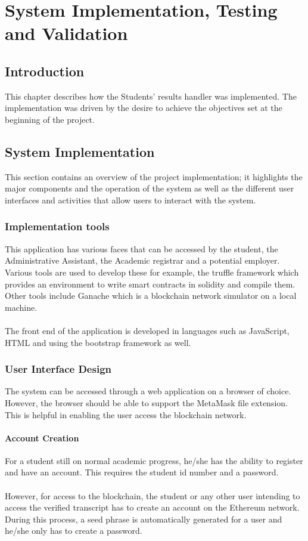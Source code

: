 \chapter{System Implementation, Testing and Validation}
\section{Introduction}
This chapter describes how the Students’ results handler was implemented. The implementation was driven by the desire to achieve the objectives set at the beginning of the project.

\section{System Implementation}
This section contains an overview of the project implementation; it highlights the major components and the operation of the system as well as the different user interfaces and activities that allow users to interact with the system.

\subsection{Implementation tools}
This application has various faces that can be accessed by the student, the Administrative Assistant, the Academic registrar and a potential employer. Various tools are used to develop these for example, the truffle framework which provides an environment to write smart contracts in solidity and compile them. Other tools include Ganache\cite{art14} which is a blockchain network simulator on a local machine.\\~\\
The front end of the application is developed in languages such as JavaScript, HTML and using the bootstrap framework as well.

\subsection{User Interface Design}
The system can be accessed through a web application on a browser of choice. However, the browser should be able to support the MetaMask file extension. This is helpful in enabling the user access the blockchain network.

\subsubsection{Account Creation}
For a student still on normal academic progress, he/she has the ability to register and have an account. This requires the student id number and a password. \\~\\
However, for access to the blockchain, the student or any other user intending to access the verified transcript has to create an account on the Ethereum\cite{art13} network. During this process, a seed phrase is automatically generated for a user and he/she only has to create a password.

